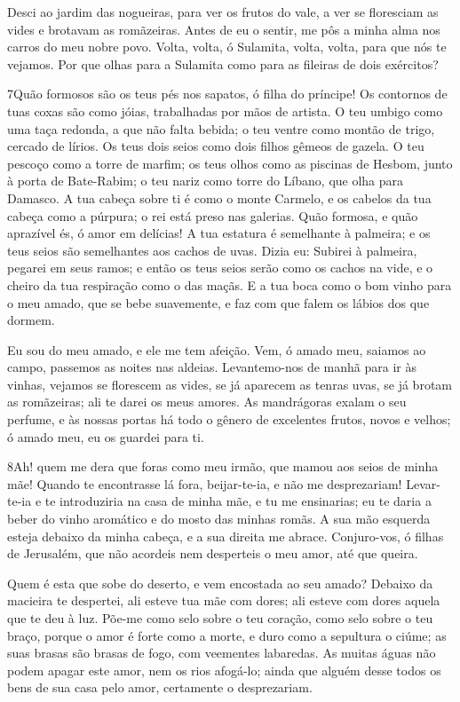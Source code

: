 Desci ao jardim das nogueiras, para ver os frutos do vale, a ver
se floresciam as vides e brotavam as romãzeiras. Antes de eu
o sentir, me pôs a minha alma nos carros do meu nobre povo.
Volta, volta, ó Sulamita, volta, volta, para que nós te
vejamos. Por que olhas para a Sulamita como para as fileiras de dois
exércitos?

\medskip

\lettrine{7} Quão formosos são os teus pés nos sapatos, ó
filha do príncipe! Os contornos de tuas coxas são como jóias,
trabalhadas por mãos de artista. O teu umbigo como uma taça
redonda, a que não falta bebida; o teu ventre como montão de trigo,
cercado de lírios. Os teus dois seios como dois filhos gêmeos de
gazela. O teu pescoço como a torre de marfim; os teus olhos como
as piscinas de Hesbom, junto à porta de Bate-Rabim; o teu nariz como
torre do Líbano, que olha para Damasco. A tua cabeça sobre ti é
como o monte Carmelo, e os cabelos da tua cabeça como a púrpura; o
rei está preso nas galerias. Quão formosa, e quão aprazível és,
ó amor em delícias! A tua estatura é semelhante à palmeira; e os
teus seios são semelhantes aos cachos de uvas. Dizia eu: Subirei
à palmeira, pegarei em seus ramos; e então os teus seios serão como
os cachos na vide, e o cheiro da tua respiração como o das maçãs.
E a tua boca como o bom vinho para o meu amado, que se bebe
suavemente, e faz com que falem os lábios dos que dormem.

Eu sou do meu amado, e ele me tem afeição. Vem, ó amado
meu, saiamos ao campo, passemos as noites nas aldeias.
Levantemo-nos de manhã para ir às vinhas, vejamos se
florescem as vides, se já aparecem as tenras uvas, se já brotam as
romãzeiras; ali te darei os meus amores. As mandrágoras
exalam o seu perfume, e às nossas portas há todo o gênero de
excelentes frutos, novos e velhos; ó amado meu, eu os guardei para
ti.

\medskip

\lettrine{8} Ah! quem me dera que foras como meu irmão, que
mamou aos seios de minha mãe! Quando te encontrasse lá fora,
beijar-te-ia, e não me desprezariam! Levar-te-ia e te
introduziria na casa de minha mãe, e tu me ensinarias; eu te daria a
beber do vinho aromático e do mosto das minhas romãs. A sua mão
esquerda esteja debaixo da minha cabeça, e a sua direita me abrace.
Conjuro-vos, ó filhas de Jerusalém, que não acordeis nem
desperteis o meu amor, até que queira.

Quem é esta que sobe do deserto, e vem encostada ao seu amado?
Debaixo da macieira te despertei, ali esteve tua mãe com dores; ali
esteve com dores aquela que te deu à luz. Põe-me como selo sobre
o teu coração, como selo sobre o teu braço, porque o amor é forte
como a morte, e duro como a sepultura o ciúme; as suas brasas são
brasas de fogo, com veementes labaredas. As muitas águas não
podem apagar este amor, nem os rios afogá-lo; ainda que alguém desse
todos os bens de sua casa pelo amor, certamente o desprezariam.

